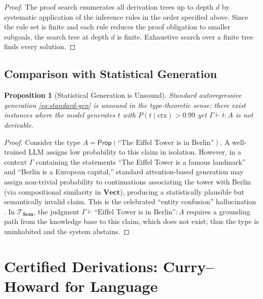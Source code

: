 \documentclass[11pt,a4paper]{article}
\theoremstyle{plain}
\newtheorem{proposition}[theorem]{Proposition}
\theoremstyle{definition}
\theoremstyle{remark}
\newcommand{\Sem}{\mathbf{Sem}}
\newcommand{\Vect}{\mathbf{Vect}}
\begin{document}
\begin{proof}
The proof search enumerates all derivation trees up to depth $d$ by systematic application of the inference rules in the order specified above.
Since the rule set is finite and each rule reduces the proof obligation to smaller subgoals, the search tree at depth $d$ is finite.
Exhaustive search over a finite tree finds every solution.
\end{proof}

\subsection{Comparison with Statistical Generation}

\begin{proposition}[Statistical Generation is Unsound]\label{prop:unsound}
Standard autoregressive generation \eqref{eq:standard-gen} is unsound in the type-theoretic sense: there exist instances where the model generates $t$ with $P(t \mid \mathrm{ctx}) > 0.99$ yet $\Gamma \vdash t : A$ is not derivable.
\end{proposition}

\begin{proof}
Consider the type $A = \mathsf{Prop}(\text{``The Eiffel Tower is in Berlin''})$.
A well-trained LLM assigns low probability to this claim in isolation.
However, in a context $\Gamma$ containing the statements ``The Eiffel Tower is a famous landmark'' and ``Berlin is a European capital,'' standard attention-based generation may assign non-trivial probability to continuations associating the tower with Berlin (via compositional similarity in $\Vect$), producing a statistically plausible but semantically invalid claim.
This is the celebrated ``entity confusion'' hallucination \cite{ji2023survey}.
In $\mathcal{T}_{\Sem}$, the judgment $\Gamma \vdash \text{``Eiffel Tower is in Berlin''} : A$ requires a grounding path from the knowledge base to this claim, which does not exist; thus the type is uninhabited and the system abstains.
\end{proof}


\section{Certified Derivations: Curry--Howard for Language}\label{sec:certified}
\end{document}
